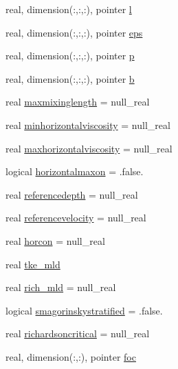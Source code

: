 \begin{DoxyCompactItemize}
\item 
real, dimension(\+:,\+:,\+:), pointer \mbox{\hyperlink{structmoduleturbulence_1_1t__turbvar_a1fb9de7cc971d1614413ce64c3d66a31}{l}}
\item 
real, dimension(\+:,\+:,\+:), pointer \mbox{\hyperlink{structmoduleturbulence_1_1t__turbvar_a3a3e9e1ecd528b3422dcad18e13647ce}{eps}}
\item 
real, dimension(\+:,\+:,\+:), pointer \mbox{\hyperlink{structmoduleturbulence_1_1t__turbvar_acae0db78151ee9d23ca483c8dd3431e0}{p}}
\item 
real, dimension(\+:,\+:,\+:), pointer \mbox{\hyperlink{structmoduleturbulence_1_1t__turbvar_a9a0bff9ae29e7fd0f7d3afe2ae5170ae}{b}}
\item 
real \mbox{\hyperlink{structmoduleturbulence_1_1t__turbvar_aae148c64556d37a076122fffa73da7b6}{maxmixinglength}} = null\+\_\+real
\item 
real \mbox{\hyperlink{structmoduleturbulence_1_1t__turbvar_a8343cc122964fc4677eeb877512d9eb3}{minhorizontalviscosity}} = null\+\_\+real
\item 
real \mbox{\hyperlink{structmoduleturbulence_1_1t__turbvar_ada7a5607126393373b481c9818765c5c}{maxhorizontalviscosity}} = null\+\_\+real
\item 
logical \mbox{\hyperlink{structmoduleturbulence_1_1t__turbvar_ab233479f5b0c5bd0d079f020dae29a13}{horizontalmaxon}} = .false.
\item 
real \mbox{\hyperlink{structmoduleturbulence_1_1t__turbvar_a5bbb80e65925eaec9b57f659b181c997}{referencedepth}} = null\+\_\+real
\item 
real \mbox{\hyperlink{structmoduleturbulence_1_1t__turbvar_aa303bb6827c2b990ca49984336c70df6}{referencevelocity}} = null\+\_\+real
\item 
real \mbox{\hyperlink{structmoduleturbulence_1_1t__turbvar_a78cbd6320112cf6c541d780409222c2c}{horcon}} = null\+\_\+real
\item 
real \mbox{\hyperlink{structmoduleturbulence_1_1t__turbvar_aa90b6d9fb951316268aeb4218671370d}{tke\+\_\+mld}}
\item 
real \mbox{\hyperlink{structmoduleturbulence_1_1t__turbvar_ad7a1efd4db82fe2d95fab01d565d5958}{rich\+\_\+mld}} = null\+\_\+real
\item 
logical \mbox{\hyperlink{structmoduleturbulence_1_1t__turbvar_a79f4b563580f3e73be967a8571013539}{smagorinskystratified}} = .false.
\item 
real \mbox{\hyperlink{structmoduleturbulence_1_1t__turbvar_abaef587ac98237e2198c758b5d249e66}{richardsoncritical}} = null\+\_\+real
\item 
real, dimension(\+:,\+:), pointer \mbox{\hyperlink{structmoduleturbulence_1_1t__turbvar_af1ef68f7988a20831f480b440290d5b3}{foc}}
\end{DoxyCompactItemize}


